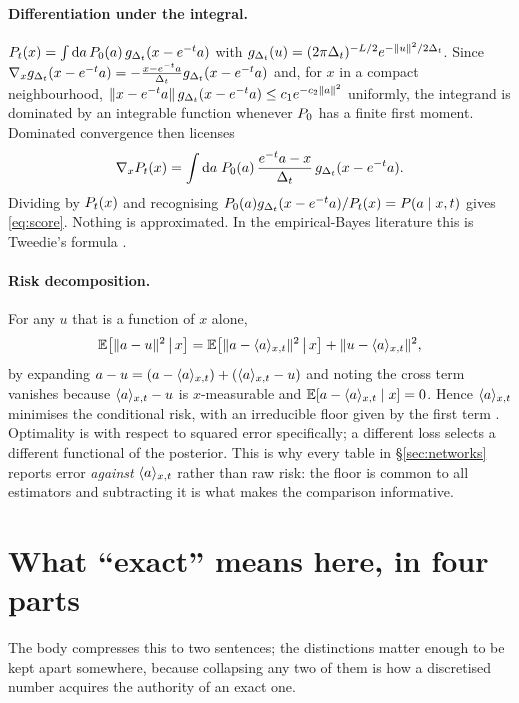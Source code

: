 \paragraph{Differentiation under the integral.}
$P_t(x) = \int\mathrm{d}a\,P_0(a)\,g_{\Delta_t}(x-e^{-t}a)$ with
$g_{\Delta_t}(u) = (2\pi\Delta_t)^{-L/2}e^{-\|u\|^2/2\Delta_t}$. Since
$\nabla_x g_{\Delta_t}(x-e^{-t}a) = -\frac{x-e^{-t}a}{\Delta_t}g_{\Delta_t}(x-e^{-t}a)$ and, for $x$ in a
compact neighbourhood, $\|x-e^{-t}a\|\,g_{\Delta_t}(x-e^{-t}a) \le c_1 e^{-c_2\|a\|^2}$ uniformly, the
integrand is dominated by an integrable function whenever $P_0$ has a finite first moment.
Dominated convergence then licenses
\[
\nabla_x P_t(x)
= \int \mathrm{d}a\; P_0(a)\,\frac{e^{-t}a - x}{\Delta_t}\, g_{\Delta_t}(x-e^{-t}a).
\]
Dividing by $P_t(x)$ and recognising $P_0(a)g_{\Delta_t}(x-e^{-t}a)/P_t(x) = P(a\mid x,t)$ gives
\eqref{eq:score}. Nothing is approximated. In the empirical-Bayes literature this is Tweedie's
formula \citep{robbins1956empirical,miyasawa1961empirical,efron2011tweedie}.

\paragraph{Risk decomposition.} For any $u$ that is a function of $x$ alone,
\begin{equation}
\label{eq:orthogonal}
\mathbb{E}\!\left[\|a-u\|^2 \,\middle|\, x\right]
= \mathbb{E}\!\left[\|a - \langle a \rangle_{x,t}\|^2 \,\middle|\, x\right] + \|u - \langle a \rangle_{x,t}\|^2 ,
\end{equation}
by expanding $a-u = (a-\langle a \rangle_{x,t}) + (\langle a \rangle_{x,t}-u)$ and noting the cross term vanishes because
$\langle a \rangle_{x,t}-u$ is $x$-measurable and $\mathbb{E}[a-\langle a \rangle_{x,t}\mid x]=0$. Hence $\langle a \rangle_{x,t}$ minimises the
conditional risk, with an irreducible floor given by the first term \citep{lehmann1998}.
Optimality is with respect to squared error specifically; a different loss selects a different
functional of the posterior. This is why every table in \S\ref{sec:networks} reports error
\emph{against} $\langle a \rangle_{x,t}$ rather than raw risk: the floor is common to all estimators and
subtracting it is what makes the comparison informative.

\section{What ``exact'' means here, in four parts}
\label{app:exactness}

The body compresses this to two sentences; the distinctions matter enough to be kept apart
somewhere, because collapsing any two of them is how a discretised number acquires the authority
of an exact one.

